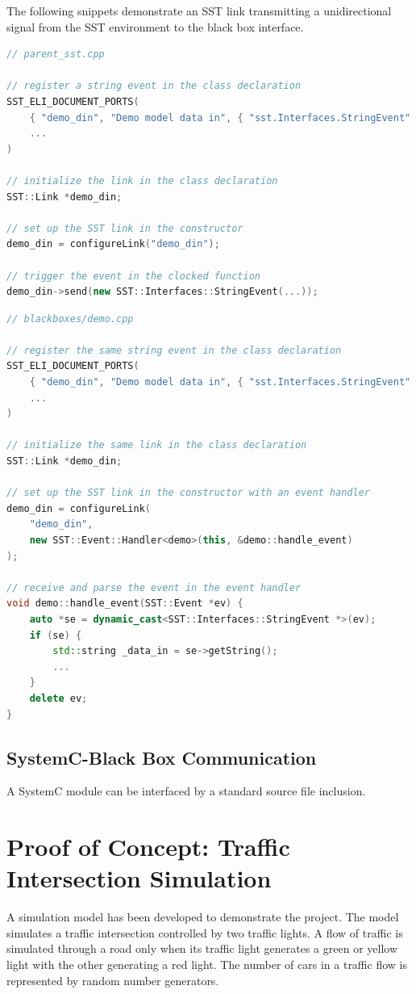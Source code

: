 \documentclass{article}
\begin{document}
    The following snippets demonstrate an SST link transmitting a unidirectional signal from the SST
    environment to the black box interface.

\begin{lstlisting}[language=C++]
// parent_sst.cpp

// register a string event in the class declaration
SST_ELI_DOCUMENT_PORTS(
    { "demo_din", "Demo model data in", { "sst.Interfaces.StringEvent" }},
    ...
)

// initialize the link in the class declaration
SST::Link *demo_din;

// set up the SST link in the constructor
demo_din = configureLink("demo_din");

// trigger the event in the clocked function
demo_din->send(new SST::Interfaces::StringEvent(...));
\end{lstlisting}

\begin{lstlisting}[language=C++]
// blackboxes/demo.cpp

// register the same string event in the class declaration
SST_ELI_DOCUMENT_PORTS(
    { "demo_din", "Demo model data in", { "sst.Interfaces.StringEvent" }},
    ...
)

// initialize the same link in the class declaration
SST::Link *demo_din;

// set up the SST link in the constructor with an event handler
demo_din = configureLink(
    "demo_din",
    new SST::Event::Handler<demo>(this, &demo::handle_event)
);

// receive and parse the event in the event handler
void demo::handle_event(SST::Event *ev) {
    auto *se = dynamic_cast<SST::Interfaces::StringEvent *>(ev);
    if (se) {
        std::string _data_in = se->getString();
        ...
    }
    delete ev;
}
\end{lstlisting}

    \subsection{SystemC-Black Box Communication}
    A SystemC module can be interfaced by a standard source file inclusion.

  \section{Proof of Concept: Traffic Intersection Simulation}
  A simulation model has been developed to demonstrate the project. The model simulates a traffic
  intersection controlled by two traffic lights. A flow of traffic is simulated through a road only
  when its traffic light generates a green or yellow light with the other generating a red light.
  The number of cars in a traffic flow is represented by random number generators.
\end{document}

